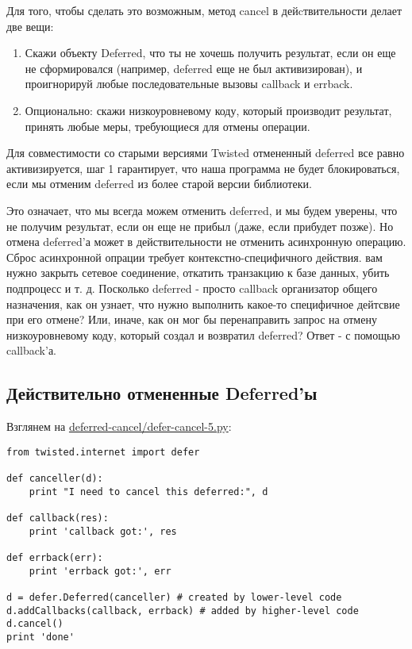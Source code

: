 Для того, чтобы сделать это возможным, метод cancel 
в дейcтвительности делает две вещи:

\begin{enumerate}
\item Скажи объекту Deferred, что ты не хочешь получить результат, если он 
    еще не сформировался (например, deferred еще не был активизирован), и 
    проигнорируй любые последовательные вызовы callback и errback.

\item Опционально: скажи низкоуровневому коду, который производит результат, 
    принять любые меры, требующиеся для отмены операции.
\end{enumerate}


Для совместимости со старыми версиями Twisted 
отмененный deferred все равно активизируется, 
шаг 1 гарантирует, что наша программа не будет 
блокироваться, если  мы отменим deferred из более 
старой версии библиотеки.


Это означает, что мы всегда можем отменить deferred, и мы 
будем уверены, что не получим результат, если он еще не 
прибыл (даже, если прибудет позже). Но отмена deferred'а может 
в действительности не отменить асинхронную операцию. Сброс 
асинхронной опрации требует контекстно-специфичного действия. 
вам нужно закрыть сетевое соединение, откатить транзакцию к 
базе данных, убить подпроцесс и т. д. Посколько deferred - 
просто callback организатор общего назначения, как он 
узнает, что нужно выполнить какое-то специфичное дейтсвие при 
его отмене? Или, иначе, как он мог бы перенаправить запрос 
на отмену низкоуровневому коду, который создал и возвратил 
deferred? Ответ - с помощью callback'а. 

    
\subsection{Действительно отмененные Deferred'ы}

Взглянем на 
\href{http://github.com/jdavisp3/twisted-intro/blob/master/deferred-cancel/defer-cancel-5.py#L1}{deferred-cancel/defer-cancel-5.py}:

 \begin{verbatim}
from twisted.internet import defer

def canceller(d):
    print "I need to cancel this deferred:", d

def callback(res):
    print 'callback got:', res

def errback(err):
    print 'errback got:', err

d = defer.Deferred(canceller) # created by lower-level code
d.addCallbacks(callback, errback) # added by higher-level code
d.cancel()
print 'done'
\end{verbatim} 


